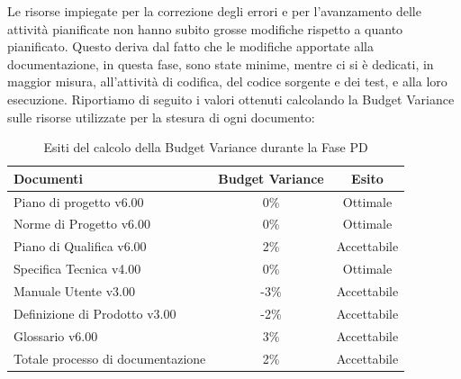 			Le risorse impiegate per la correzione degli errori e per l'avanzamento delle attività pianificate non hanno subito grosse modifiche rispetto a quanto pianificato. Questo deriva dal fatto che le modifiche apportate alla documentazione, in questa fase, sono state minime, mentre ci si è dedicati, in maggior misura, all'attività di codifica, del codice sorgente e dei test, e alla loro esecuzione.
			Riportiamo di seguito i valori ottenuti calcolando la Budget Variance sulle risorse utilizzate per la stesura di ogni documento:
			\begin{table}[H]
					\centering
					\begin{tabu}{| l | c | c |}
							\hline
							Documenti 							& Budget Variance	& Esito		\\ \hline \hline							
							Piano di progetto v6.00				& 0\% 		& Ottimale  \\ \hline
							Norme di Progetto v6.00 			& 0\%		& Ottimale  \\ \hline
							Piano di Qualifica v6.00 			& 2\%		& Accettabile  \\ \hline
							Specifica Tecnica v4.00 			& 0\%		& Ottimale  \\ \hline
							Manuale Utente v3.00 				& -3\%		& Accettabile  \\ \hline
							Definizione di Prodotto v3.00 		& -2\%		& Accettabile  \\ \hline
							Glossario v6.00					 	& 3\% 		& Accettabile  \\ \hline
							Totale processo di documentazione 	& 2\% 		& Accettabile \\ \hline
					\end{tabu}
				\caption{Esiti del calcolo della Budget Variance durante la Fase PD}
			\end{table}
							
